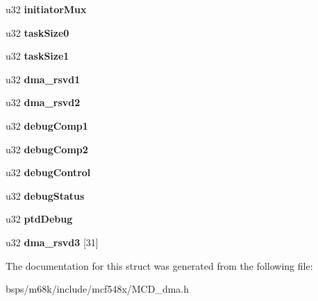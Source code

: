 \begin{DoxyCompactItemize}
\item 
\mbox{\label{structdmaRegs__s_af2a132827e32e617f27dce1e16cc40cb}} 
u32 {\bfseries initiator\+Mux}
\item 
\mbox{\label{structdmaRegs__s_af225161194331e17d6323d2b254b9c50}} 
u32 {\bfseries task\+Size0}
\item 
\mbox{\label{structdmaRegs__s_adf7b88c1338761089d8ecb28ee0af169}} 
u32 {\bfseries task\+Size1}
\item 
\mbox{\label{structdmaRegs__s_a01feb964f87111e4460e8709f6681e77}} 
u32 {\bfseries dma\+\_\+rsvd1}
\item 
\mbox{\label{structdmaRegs__s_a9ca5918fb92fe58f7b037ce6984e71f5}} 
u32 {\bfseries dma\+\_\+rsvd2}
\item 
\mbox{\label{structdmaRegs__s_ae0ff0126df298062bb9865633754a5b7}} 
u32 {\bfseries debug\+Comp1}
\item 
\mbox{\label{structdmaRegs__s_aa4507b803e9ff50211d8dc6e3dd9677d}} 
u32 {\bfseries debug\+Comp2}
\item 
\mbox{\label{structdmaRegs__s_a6d2e00e378b60d1c8b81ac950109c726}} 
u32 {\bfseries debug\+Control}
\item 
\mbox{\label{structdmaRegs__s_a07adc92305d8c0aade1158824c46974f}} 
u32 {\bfseries debug\+Status}
\item 
\mbox{\label{structdmaRegs__s_ac61b3290c9df938e6ed6a71f397974a5}} 
u32 {\bfseries ptd\+Debug}
\item 
\mbox{\label{structdmaRegs__s_a5f033ba968ef939d9b68614da8a5b0c0}} 
u32 {\bfseries dma\+\_\+rsvd3} \mbox{[}31\mbox{]}
\end{DoxyCompactItemize}


The documentation for this struct was generated from the following file\+:\begin{DoxyCompactItemize}
\item 
bsps/m68k/include/mcf548x/M\+C\+D\+\_\+dma.\+h\end{DoxyCompactItemize}
